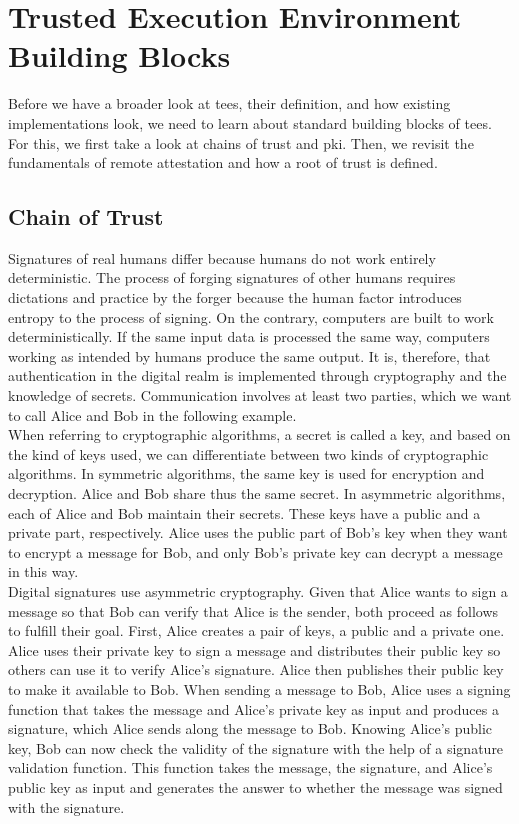 \section{Trusted Execution Environment Building Blocks}
\label{sec:20:building_blocks}
Before we have a broader look at \glspl{tee}, their definition, and how existing
implementations look, we need to learn about standard building blocks of
\glspl{tee}. For this, we first take a look at chains of trust and \gls{pki}.
Then, we revisit the fundamentals of remote attestation and how a root of
trust is defined.

\subsection{Chain of Trust}
\label{sec:20:chain_of_trust}
Signatures of real humans differ because humans do not work entirely
deterministic. The process of forging signatures of other humans requires
dictations and practice by the forger because the human factor introduces
entropy to the process of signing. On the contrary, computers are built to work
deterministically. If the same input data is processed the same way, computers
working as intended by humans produce the same output. It is, therefore, that
authentication in the digital realm is implemented through cryptography and the
knowledge of secrets. Communication involves at least two parties, which we want
to call Alice and Bob in the following example.\\

When referring to cryptographic algorithms, a secret is called a key, and based
on the kind of keys used, we can differentiate between two kinds of
cryptographic algorithms. In symmetric algorithms, the same key is used for
encryption and decryption. Alice and Bob share thus the same secret. In
asymmetric algorithms, each of Alice and Bob maintain their secrets. These keys
have a public and a private part, respectively. Alice uses the public part of
Bob's key when they want to encrypt a message for Bob, and only Bob's private
key can decrypt a message in this way.\\

Digital signatures use asymmetric cryptography. Given that Alice wants to sign a
message so that Bob can verify that Alice is the sender, both proceed as follows
to fulfill their goal. First, Alice creates a pair of keys, a public and a
private one. Alice uses their private key to sign a message and distributes
their public key so others can use it to verify Alice's signature.  Alice then
publishes their public key to make it available to Bob. When sending a message
to Bob, Alice uses a signing function that takes the message and Alice's private
key as input and produces a signature, which Alice sends along the message to
Bob. Knowing Alice's public key, Bob can now check the validity of the signature
with the help of a signature validation function. This function takes the
message, the signature, and Alice's public key as input and generates the answer
to whether the message was signed with the signature.\\

